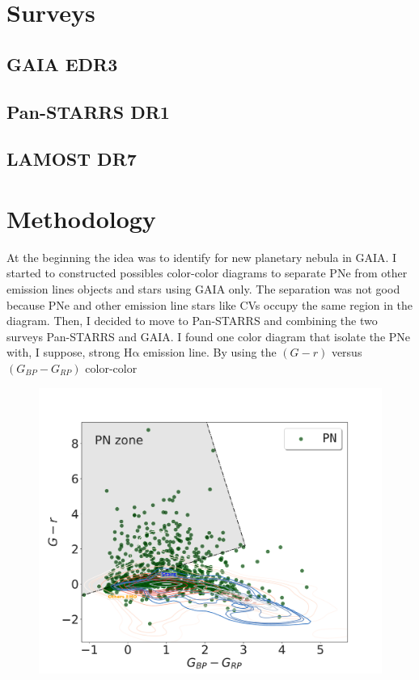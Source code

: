 \documentclass{article}
\newcommand\ha{\ensuremath{\mathrm{H\alpha}}}
\begin{document}
\section{Surveys}
\label{sec:surveys}

\subsection{GAIA EDR3}
\label{sec:gaia}

\subsection{Pan-STARRS DR1}
\label{sec:gaia}

\subsection{LAMOST DR7}
\label{sec:gaia}

\section{Methodology}
\label{sec:surveys}

At the beginning the idea was to identify for new planetary nebula in GAIA. I started to constructed possibles color-color diagrams to separate PNe from other emission lines objects and stars using GAIA only. The separation was not good because PNe and other emission line stars like CVs occupy the same region in the diagram. Then, I decided to move to Pan-STARRS and combining the two surveys Pan-STARRS and GAIA. I found one color diagram that isolate the PNe with, I suppose, strong \ha{} emission line. By using the \((G - r)\) versus \((G_{BP} - G_{RP})\) color-color

\begin{figure}
\centering
  \includegraphics[width=0.9\linewidth]{../Figs/color-diagram-ps-gaiaEDR3.pdf}
  \caption{} 
  \label{fig:Viironen}
\end{figure}


\end{document}

